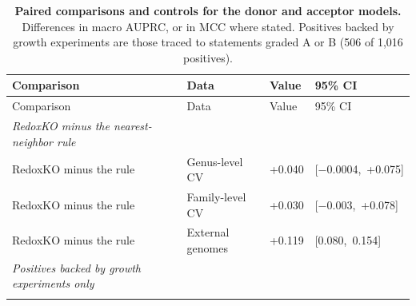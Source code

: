 \documentclass[10pt,a4paper,onecolumn]{article}
\begin{document}
{\begin{longtable}[]{@{}
  >{\raggedright\arraybackslash}p{}
  >{\raggedright\arraybackslash}p{}
  >{\raggedleft\arraybackslash}p{}
  >{\raggedright\arraybackslash}p{}@{}}
\caption{\textbf{Paired comparisons and controls for the donor and
acceptor models.} Differences in macro AUPRC, or in MCC where stated.
Positives backed by growth experiments are those traced to statements
graded A or B (506 of 1,016 positives).
\label{tab:s_paired}}\tabularnewline
\toprule\noalign{}
\begin{minipage}[b]{\linewidth}\raggedright
Comparison
\end{minipage} & \begin{minipage}[b]{\linewidth}\raggedright
Data
\end{minipage} & \begin{minipage}[b]{\linewidth}\raggedleft
Value
\end{minipage} & \begin{minipage}[b]{\linewidth}\raggedright
95\% CI
\end{minipage} \\
\midrule\noalign{}
\endfirsthead
\toprule\noalign{}
\begin{minipage}[b]{\linewidth}\raggedright
Comparison
\end{minipage} & \begin{minipage}[b]{\linewidth}\raggedright
Data
\end{minipage} & \begin{minipage}[b]{\linewidth}\raggedleft
Value
\end{minipage} & \begin{minipage}[b]{\linewidth}\raggedright
95\% CI
\end{minipage} \\
\midrule\noalign{}
\endhead
\bottomrule\noalign{}
\endlastfoot
\emph{RedoxKO minus the nearest-neighbor rule} & & & \\*
\quad RedoxKO minus the rule & Genus-level CV & +0.040 &
{[}−0.0004,~+0.075{]} \\
\quad RedoxKO minus the rule & Family-level CV & +0.030 &
{[}−0.003,~+0.078{]} \\
\quad RedoxKO minus the rule & External genomes & +0.119 &
{[}0.080,~0.154{]} \\
\emph{Positives backed by growth experiments only} & & & \\*

\end{longtable}}
\end{document}

